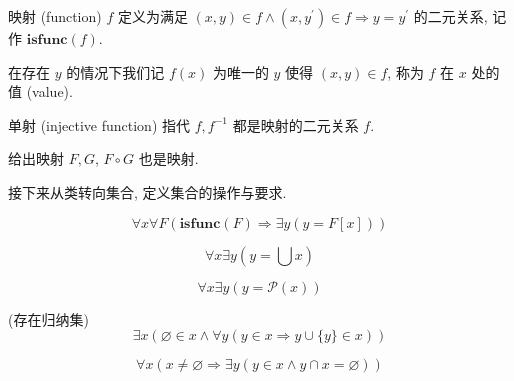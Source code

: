 \begin{definition}
    \label {definition:function (set)}
    映射 (function) \(f\) 定义为满足 \((x,y) \in f \land (x,y^\prime) \in f \Rightarrow y = y^\prime\) 的二元关系, 记作 \(\mathbf{isfunc} (f)\).

    在存在 \(y\) 的情况下我们记 \(f(x)\) 为唯一的 \(y\) 使得 \((x,y) \in f\), 称为 \(f\) 在 \(x\) 处的值 (value).
\end{definition}

\begin{definition}
    \label {definition:injective function (set)}
    单射 (injective function) 指代 \(f, f^{-1}\) 都是映射的二元关系 \(f\).
\end{definition}

\begin{corollary}
    给出映射 \(F, G\), \(F \circ G\) 也是映射.
\end{corollary}

接下来从类转向集合, 定义集合的操作与要求.

\begin{axiom}
    \label {axiom:NBG Axiom of Replacement}
    \[
        \forall x \forall F (\mathbf{isfunc} (F) \Rightarrow \exists y (y = F[x]))
    \]
\end{axiom}

\begin{axiom}
    \label {axiom:NBG Axiom of Union}
    \[
        \forall x \exists y (y = \bigcup x)
    \]
\end{axiom}

\begin{axiom}
    \label {axiom:NBG Axiom of Power Set}
    \[
        \forall x \exists y (y = \mathcal{P} (x))
    \]
\end{axiom}

\begin{axiom}
    \label {axiom:NBG Axiom of Infinity} (存在归纳集)
    \[
        \exists x (\varnothing \in x \land \forall y (y \in x \Rightarrow y \cup \{y\} \in x))
    \]
\end{axiom}

\begin{axiom}
    \label {axiom:NBG Axiom of Foundation}
    \[
        \forall x (x \neq \varnothing \Rightarrow \exists y (y \in x \land y \cap x = \varnothing))
    \]
\end{axiom}

